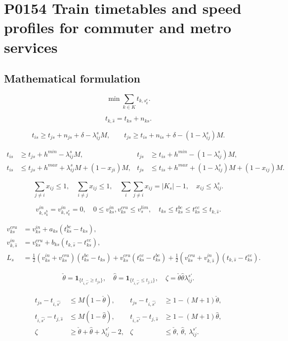 \documentclass[10pt]{article}
\begin{document}
\section*{P0154 Train timetables and speed profiles for commuter and metro services}
\subsection*{Mathematical formulation}
\[
\min\sum_{k\in K}t_{k,s_k^e}.
\]

\[
t_{k,\widehat s}=t_{ks}+n_{ks}.
\]

\[
t_{is}\ge t_{js}+n_{js}+\delta-\lambda_{ij}^sM,\qquad
t_{js}\ge t_{is}+n_{is}+\delta-(1-\lambda_{ij}^s)M.
\]

\begin{align*}
t_{is}&\ge t_{js}+h^{min}-\lambda_{ij}^sM,&
t_{js}&\ge t_{is}+h^{min}-(1-\lambda_{ij}^s)M,\\
t_{is}&\le t_{js}+h^{max}+\lambda_{ij}^sM+(1-x_{ji})M,&
t_{js}&\le t_{is}+h^{max}+(1-\lambda_{ij}^s)M+(1-x_{ij})M.
\end{align*}

\[
\sum_{j\ne i}x_{ij}\le1,\quad \sum_{i\ne j}x_{ij}\le1,\quad
\sum_i\sum_{j\ne i}x_{ij}=|K_s|-1,\quad x_{ij}\le\lambda_{ij}^s.
\]

\[
v^{in}_{k,s_k^b}=v^{in}_{k,s_k^e}=0,\quad
0\le v^{in}_{ks},v^{cru}_{ks}\le v_s^{lim},\quad
t_{ks}\le t^{bc}_{ks}\le t^{ec}_{ks}\le t_{k,\widehat s}.
\]

\begin{align*}
v^{cru}_{ks}&=v^{in}_{ks}+a_{ks}(t^{bc}_{ks}-t_{ks}),\\
v^{in}_{k,\widehat s}&=v^{cru}_{ks}+b_{ks}(t_{k,\widehat s}-t^{ec}_{ks}),\\
L_s&=\tfrac12(v^{in}_{ks}+v^{cru}_{ks})(t^{bc}_{ks}-t_{ks})
 +v^{cru}_{ks}(t^{ec}_{ks}-t^{bc}_{ks})
 +\tfrac12(v^{cru}_{ks}+v^{in}_{k,\widehat s})(t_{k,\widehat s}-t^{ec}_{ks}).
\end{align*}

\[
\check\theta=\mathbf1_{\{t_{i,\widehat{s'}}\ge t_{js}\}},\quad
\hat\theta=\mathbf1_{\{t_{i,\widehat{s'}}\le t_{j,\widehat s}\}},\quad
\zeta=\check\theta\hat\theta\lambda_{ij}^{s'}.
\]

\begin{align*}
t_{js}-t_{i,\widehat{s'}}&\le M(1-\check\theta),&
t_{js}-t_{i,\widehat{s'}}&\ge1-(M+1)\check\theta,\\
t_{i,\widehat{s'}}-t_{j,\widehat s}&\le M(1-\hat\theta),&
t_{i,\widehat{s'}}-t_{j,\widehat s}&\ge1-(M+1)\hat\theta,\\
\zeta&\ge\check\theta+\hat\theta+\lambda_{ij}^{s'}-2,&
\zeta&\le\check\theta,\ \hat\theta,\ \lambda_{ij}^{s'} .
\end{align*}
\end{document}
